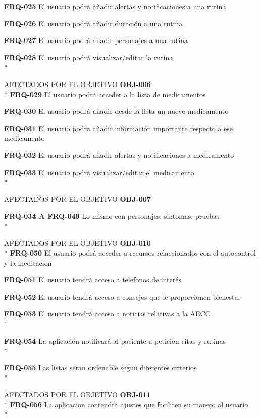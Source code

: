 \documentclass[../pfc.tex]{subfiles}
\begin{document}
	\textbf{FRQ-025}	El usuario podrá añadir alertas y notificaciones a una rutina
	
	\textbf{FRQ-026}	El usuario podrá añadir duración a una rutina
	
	\textbf{FRQ-027}	El usuario podrá añadir personajes a una rutina
	
	\textbf{FRQ-028}	El usuario podrá visualizar/editar la rutina\\*
	
	
	AFECTADOS POR EL OBJETIVO 	\textbf{OBJ-006}\\*
	\textbf{FRQ-029}	El usuario podrá acceder a la lista de medicamentos
	
	\textbf{FRQ-030}	El usuario podrá añadir desde la lista un nuevo medicamento
	
	\textbf{FRQ-031}	El usuario podra añadir información importante respecto a ese medicamento
	
	\textbf{FRQ-032}	El usuario podrá añadir alertas y notificaciones a medicamento
	
	\textbf{FRQ-033}	El usuario podrá visualizar/editar el medicamento\\*
	
	
	AFECTADOS POR EL OBJETIVO 	\textbf{OBJ-007}
	
	\textbf{FRQ-034 A FRQ-049}	Lo mismo con personajes, sintomas, pruebas\\*
	
	
	
	AFECTADOS POR EL OBJETIVO 	\textbf{OBJ-010}\\*
	\textbf{FRQ-050}	El usuario podrá acceder a recursos relaccionados con el autocontrol y la meditacion
	
	\textbf{FRQ-051}	El usuario tendrá acceso a telefonos de interés
	
	\textbf{FRQ-052}	El usuario tendrá acceso a consejos que le proporcionen bienestar
	
	\textbf{FRQ-053}	El usuario tendrá acceso a noticias relativas a la AECC\\*
	
	
	
	\textbf{FRQ-054}	La aplicación notificará al paciente a peticion citas y rutinas\\*
	
	\textbf{FRQ-055}	Las listas seran ordenable segun diferentes criterios\\*
	
	
	AFECTADOS POR EL OBJETIVO 	\textbf{OBJ-011}\\*
	\textbf{FRQ-056}	La aplicacion contendrá ajustes que faciliten su manejo al usuario\\*
	
\end{document}
